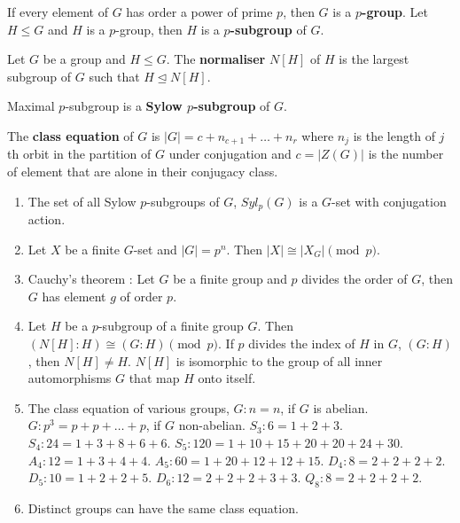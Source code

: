 \begin{definition}
	If every element of $G$ has order a power of prime $p$, then $G$ is a \textbf{$p$-group}.
	Let $H \le G$ and $H$ is a $p$-group, then $H$ is a \textbf{$p$-subgroup} of $G$.
\end{definition}
\begin{definition}
	Let $G$ be a group and $H \le G$. The \textbf{normaliser} $N[H]$ of $H$ is the largest subgroup of $G$ such that $H \trianglelefteq N[H]$.
\end{definition}
\begin{definition}
	Maximal $p$-subgroup is a \textbf{Sylow $p$-subgroup} of $G$.
\end{definition}
\begin{definition}
	The \textbf{class equation} of $G$ is $|G| = c + n_{c+1} + \dots + n_r$ where $n_j$ is the length of $j$th orbit in the partition of $G$ under conjugation and $c = |Z(G)|$ is the number of element that are alone in their conjugacy class.
\end{definition}
\begin{enumerate}
	\item The set of all Sylow $p$-subgroups of $G$, $Syl_p(G)$ is a $G$-set with conjugation action.
	\item Let $X$ be a finite $G$-set and $|G|=p^n$. Then $|X| \cong |X_G| \pmod{p}$.
	\item Cauchy's theorem : Let $G$ be a finite group and $p$ divides the order of $G$, then $G$ has element $g$ of order $p$.
	\item Let $H$ be a $p$-subgroup of a finite group $G$. Then $(N[H]:H) \cong (G:H) \pmod{p}$.
		\subitem If $p$ divides the index of $H$ in $G$, $(G:H)$, then $N[H] \ne H$.
		\subitem $N[H]$ is isomorphic to the group of all inner automorphisms $G$ that map $H$ onto itself.
	\item The class equation of various groups,
		\subitem $G :  n = n$, if $G$ is abelian.
		\subitem $G : p^3 = p + p + \dots + p$, if $G$ non-abelian.
		\subitem $S_3 : 6 = 1 + 2 + 3$.
		\subitem $S_4 : 24 = 1 + 3 + 8 + 6 + 6$.
		\subitem $S_5 : 120 = 1+ 10 + 15 + 20 + 20 + 24 + 30$.
		\subitem $A_4 : 12 = 1 + 3 + 4 + 4$.
		\subitem $A_5 : 60 = 1 + 20 + 12 + 12 + 15$.
		\subitem $D_4 : 8 = 2 + 2 + 2 + 2$.
		\subitem $D_5 : 10 = 1 + 2 + 2 + 5$.
		\subitem $D_6 : 12 = 2 + 2 + 2 + 3 + 3$.
		\subitem $Q_8 : 8 = 2 + 2 + 2 + 2$.
	\item Distinct groups can have the same class equation.
\end{enumerate}	

